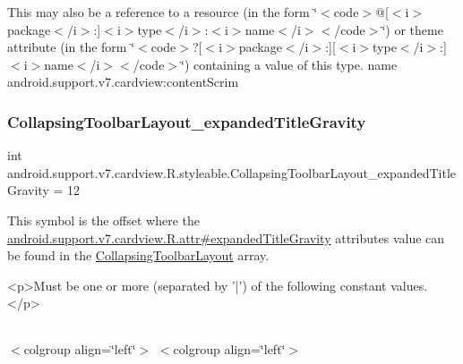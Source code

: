 This may also be a reference to a resource (in the form \char`\"{}$<$code$>$@\mbox{[}$<$i$>$package$<$/i$>$\+:\mbox{]}$<$i$>$type$<$/i$>$\+:$<$i$>$name$<$/i$>$$<$/code$>$\char`\"{}) or theme attribute (in the form \char`\"{}$<$code$>$?\mbox{[}$<$i$>$package$<$/i$>$\+:\mbox{]}\mbox{[}$<$i$>$type$<$/i$>$\+:\mbox{]}$<$i$>$name$<$/i$>$$<$/code$>$\char`\"{}) containing a value of this type.  name android.\+support.\+v7.\+cardview\+:content\+Scrim \mbox{\label{classandroid_1_1support_1_1v7_1_1cardview_1_1R_1_1styleable_aea2383ec907327db77221d2a33d06306}} 
\subsubsection{\texorpdfstring{Collapsing\+Toolbar\+Layout\+\_\+expanded\+Title\+Gravity}{CollapsingToolbarLayout\_expandedTitleGravity}}
{\footnotesize\ttfamily int android.\+support.\+v7.\+cardview.\+R.\+styleable.\+Collapsing\+Toolbar\+Layout\+\_\+expanded\+Title\+Gravity = 12\hspace{0.3cm}{\ttfamily [static]}}

This symbol is the offset where the \hyperlink{classandroid_1_1support_1_1v7_1_1cardview_1_1R_1_1attr_a068c1520150b812c70b2fb76a8fe73ae}{android.\+support.\+v7.\+cardview.\+R.\+attr\#expanded\+Title\+Gravity} attribute\textquotesingle{}s value can be found in the \hyperlink{classandroid_1_1support_1_1v7_1_1cardview_1_1R_1_1styleable_a3b4c5393d0c99cb4e5a7a3911fc606b4}{Collapsing\+Toolbar\+Layout} array.

\begin{DoxyVerb}      <p>Must be one or more (separated by '|') of the following constant values.</p>
\end{DoxyVerb}
 \tabulinesep=1mm
\begin{longtabu} spread 0pt [c]{*{0}{|X[-1]}|}
\hline
\end{longtabu}
$<$colgroup align=\char`\"{}left\char`\"{}$>$ $<$colgroup align=\char`\"{}left\char`\"{}$>$ 

